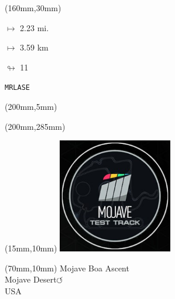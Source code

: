 \begin{textblock*}{40mm}(160mm,30mm)%
\Large
\par$\mapsto$ 2.23 mi.
\par$\mapsto$ 3.59 km
\par$\looparrowright$ 11
\par\hfill\tiny\tt MRLASE\\
\end{textblock*}
\begin{textblock*}{20mm}(200mm,5mm)%
\fbox{\thepage}
\label{MRLASE}
\end{textblock*}
\begin{textblock*}{20mm}(200mm,285mm)%
\fbox{\thepage}
\end{textblock*}

\null\newpage
\begin{textblock*}{50mm}(15mm,10mm)%
\includegraphics[width=50mm]{LG/MOJA.png}
\end{textblock*}
\begin{textblock*}{130mm}(70mm,10mm)%
{\fontsize{20}{20}\selectfont Mojave Boa Ascent\\}
{\fontsize{16}{16}\selectfont Mojave Desert\hfill \huge$\circlearrowleft$\\}
{\fontsize{12}{12}\selectfont USA\\}
\end{textblock*}
